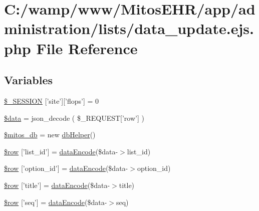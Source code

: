 \hypertarget{administration_2lists_2data__update_8ejs_8php}{\section{\-C\-:/wamp/www/\-Mitos\-E\-H\-R/app/administration/lists/data\-\_\-update.ejs.\-php \-File \-Reference}
\label{administration_2lists_2data__update_8ejs_8php}
}
\subsection*{\-Variables}
\begin{DoxyCompactItemize}
\item 
\hyperlink{administration_2lists_2data__update_8ejs_8php_a99fda8552a3e58235643b79f5af3ded8}{\$\-\_\-\-S\-E\-S\-S\-I\-O\-N} \mbox{[}'site'\mbox{]}\mbox{[}'flops'\mbox{]} = 0
\item 
\hyperlink{administration_2lists_2data__update_8ejs_8php_a6efc15b5a2314dd4b5aaa556a375c6d6}{\$data} = json\-\_\-decode ( \$\-\_\-\-R\-E\-Q\-U\-E\-S\-T\mbox{[}'row'\mbox{]} )
\item 
\hyperlink{administration_2lists_2data__update_8ejs_8php_ab5d961f93efe4e2e8d8374f01dd6c65a}{\$mitos\-\_\-db} = new \hyperlink{classdb_helper}{db\-Helper}()
\item 
\hyperlink{administration_2lists_2data__update_8ejs_8php_a76772cd03c99434f33a506cf72f49b4f}{\$row} \mbox{[}'list\-\_\-id'\mbox{]} = \hyperlink{data_exchange_8class_8php_a18220e6e744fcb46d788ed8b03b85f62}{data\-Encode}(\$data-\/$>$list\-\_\-id)
\item 
\hyperlink{administration_2lists_2data__update_8ejs_8php_ab8498685515a366e1b6d5caad5eb57ee}{\$row} \mbox{[}'option\-\_\-id'\mbox{]} = \hyperlink{data_exchange_8class_8php_a18220e6e744fcb46d788ed8b03b85f62}{data\-Encode}(\$data-\/$>$option\-\_\-id)
\item 
\hyperlink{administration_2lists_2data__update_8ejs_8php_a70d36cba6a35524466f2a4c8112c8e4e}{\$row} \mbox{[}'title'\mbox{]} = \hyperlink{data_exchange_8class_8php_a18220e6e744fcb46d788ed8b03b85f62}{data\-Encode}(\$data-\/$>$title)
\item 
\hyperlink{administration_2lists_2data__update_8ejs_8php_af07faae4f0734e368a485f115669527e}{\$row} \mbox{[}'seq'\mbox{]} = \hyperlink{data_exchange_8class_8php_a18220e6e744fcb46d788ed8b03b85f62}{data\-Encode}(\$data-\/$>$seq)

\end{DoxyCompactItemize}
